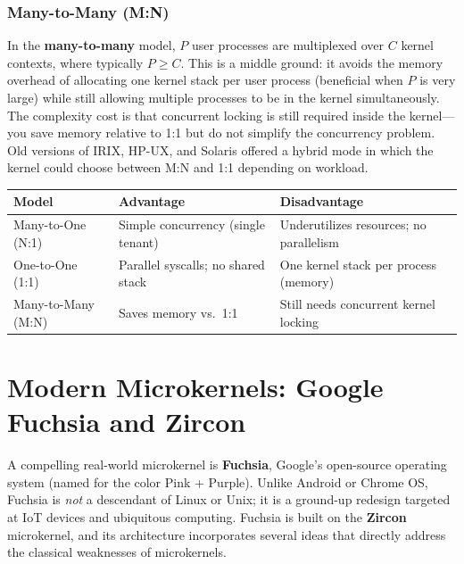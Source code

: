 \documentclass[11pt]{article}
\begin{document}
\subsubsection*{Many-to-Many (M:N)}

In the \textbf{many-to-many} model, $P$ user processes are multiplexed over $C$ kernel contexts, where typically $P \geq C$. This is a middle ground: it avoids the memory overhead of allocating one kernel stack per user process (beneficial when $P$ is very large) while still allowing multiple processes to be in the kernel simultaneously. The complexity cost is that concurrent locking is still required inside the kernel---you save memory relative to 1:1 but do not simplify the concurrency problem. Old versions of IRIX, HP-UX, and Solaris offered a hybrid mode in which the kernel could choose between M:N and 1:1 depending on workload.

\begin{center}
\begin{tabular}{lll}
\toprule
\textbf{Model} & \textbf{Advantage} & \textbf{Disadvantage} \\
\midrule
Many-to-One (N:1) & Simple concurrency (single tenant) & Underutilizes resources; no parallelism \\
One-to-One (1:1)  & Parallel syscalls; no shared stack & One kernel stack per process (memory) \\
Many-to-Many (M:N) & Saves memory vs.\ 1:1 & Still needs concurrent kernel locking \\
\bottomrule
\end{tabular}
\end{center}

\section{Modern Microkernels: Google Fuchsia and Zircon}

A compelling real-world microkernel is \textbf{Fuchsia}, Google's open-source operating system (named for the color Pink + Purple). Unlike Android or Chrome OS, Fuchsia is \emph{not} a descendant of Linux or Unix; it is a ground-up redesign targeted at IoT devices and ubiquitous computing. Fuchsia is built on the \textbf{Zircon} microkernel, and its architecture incorporates several ideas that directly address the classical weaknesses of microkernels.
\end{document}
